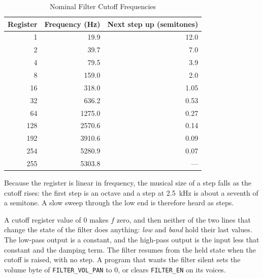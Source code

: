\begin{table}[H]
	\centering
	\begin{tabular}{rrr}
		\toprule
		\textbf{Register} & \textbf{Frequency (Hz)} & \textbf{Next step up (semitones)} \\
		\midrule
		1                 & 19.9                    & 12.0                              \\
		2                 & 39.7                    & 7.0                               \\
		4                 & 79.5                    & 3.9                               \\
		8                 & 159.0                   & 2.0                               \\
		16                & 318.0                   & 1.05                              \\
		32                & 636.2                   & 0.53                              \\
		64                & 1275.0                  & 0.27                              \\
		128               & 2570.6                  & 0.14                              \\
		192               & 3910.6                  & 0.09                              \\
		254               & 5280.9                  & 0.07                              \\
		255               & 5303.8                  & ---                               \\
		\bottomrule
	\end{tabular}
	\caption{Nominal Filter Cutoff Frequencies}
	\label{tab:filter-cutoff}
\end{table}

Because the register is linear in frequency, the musical size of a step falls as the cutoff rises: the first step is an
octave and a step at 2.5~kHz is about a seventh of a semitone. A slow sweep through the low end is therefore heard as
steps.

A cutoff register value of 0 makes $f$ zero, and then neither of the two lines that change the state of the filter does
anything: \emph{low} and \emph{band} hold their last values. The low-pass output is a constant, and the high-pass
output is the input less that constant and the damping term. The filter resumes from the held state when the cutoff is
raised, with no step. A program that wants the filter silent sets the volume byte of \texttt{FILTER\_VOL\_PAN} to 0, or
clears \texttt{FILTER\_EN} on its voices.

